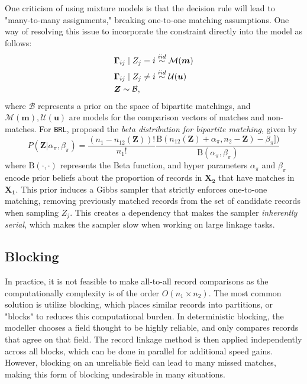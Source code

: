 \documentclass[12pt,letterpaper]{article}
\newcommand{\1}[1]{\mathbb{I}\!\left[#1\right]} %
\begin{document}
{One criticism of using mixture models is that the decision rule will lead to "many-to-many assignments," breaking one-to-one matching assumptions. One way of resolving this issue to incorporate the constraint directly into the model as follows:
\begin{align}
	&\bm{\Gamma}_{ij} \mid Z_j =i \stackrel{iid}{\sim} \mathcal{M}(\bm{m})  \\
	&\bm{\Gamma}_{ij} \mid Z_j \neq i \stackrel{iid}{\sim} \mathcal{U}(\bm{u}) \notag \\
	& \bm{Z} \sim \mathcal{B}, \notag
\end{align}
where $\mathcal{B}$ represents a prior on the space of bipartite matchings, and $\mathcal{M}(\bm{m}), \mathcal{U}(\bm{u})$ are models for the comparison vectors of matches and non-matches. For \texttt{BRL}, \cite{sadinle_bayesian_2017} proposed the \emph{beta distribution for bipartite matching}, given by
$$P(\mathbf{Z}|\alpha_{\pi}, \beta_{\pi}) = \frac{(n_1 - n_{12}(\mathbf{Z}))!}{n_1 !}\frac{\text{B}(n_{12}(\mathbf{Z}) + \alpha_{\pi}, n_2 - \mathbf{Z}) - \beta_{\pi}])}{\text{B}(\alpha_{\pi}, \beta_{\pi})}
$$
where $\text{B}(\cdot, \cdot)$ represents the Beta function, and hyper parameters $\alpha_{\pi}$ and $\beta_{\pi}$ encode prior beliefs about the proportion of records in $\bm{X_2}$ that have matches in $\bm{X_1}$. This prior induces a Gibbs sampler that strictly enforces one-to-one matching, removing previously matched records from the set of candidate
records when sampling \(Z_j\). This creates a dependency that makes the
sampler \emph{inherently serial}, which makes the sampler slow when working on large linkage tasks. 

\subsection{Blocking}

In practice, it is not feasible to make all-to-all record comparisons as the computationally complexity is of the order $O(n_1 \times n_2).$ The most common solution is utilize blocking, which places similar records into partitions, or "blocks" to reduces this computational burden. In deterministic blocking, the modeller chooses a field thought to be highly reliable, and only compares records that agree on that field. The record linkage method is then applied independently across all blocks, which can be done in parallel for additional speed gains. However, blocking on an unreliable field can lead to many missed matches, making this form of blocking undesirable in many situations.

}
\end{document}
